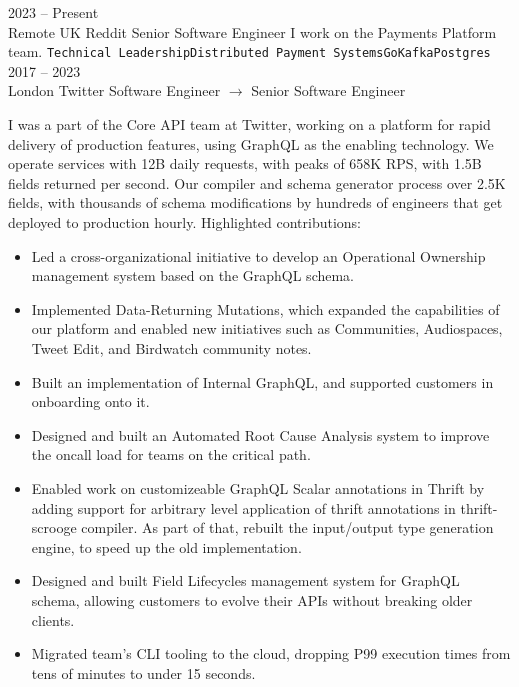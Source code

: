 \documentclass[9pt]{developercv} %
\begin{document}
\begin{entrylist}
	\entry
		{2023 -- Present\\\footnotesize{Remote UK}}
		{Reddit}
		{Senior Software Engineer}
		{
			I work on the Payments Platform team.\newline\newline
			\texttt{Technical Leadership}\slashsep\texttt{Distributed Payment Systems}\slashsep\texttt{Go}\slashsep\texttt{Kafka}\slashsep\texttt{Postgres}
		}
	\entry
		{2017 -- 2023\\\footnotesize{London}}
		{Twitter}
		{Software Engineer $\rightarrow$ Senior Software Engineer}
		{
			I was a part of the Core API team at Twitter, working on a platform for rapid delivery of production features, using GraphQL as the enabling technology. We operate services with 12B daily requests, with peaks of 658K RPS, with 1.5B fields returned per second. Our compiler and schema generator process over 2.5K fields, with thousands of schema modifications by hundreds of engineers that get deployed to production hourly.\newline\newline
			Highlighted contributions:\newline\newline
			\begin{itemize}
				\item Led a cross-organizational initiative to develop an Operational Ownership management system based on the GraphQL schema.
				\item Implemented Data-Returning Mutations, which expanded the capabilities of our platform and enabled new initiatives such as Communities, Audiospaces, Tweet Edit, and Birdwatch community notes.
				\item Built an implementation of Internal GraphQL, and supported customers in onboarding onto it.
				\item Designed and built an Automated Root Cause Analysis system to improve the oncall load for teams on the critical path.
				\item Enabled work on customizeable GraphQL Scalar annotations in Thrift by adding support for arbitrary level application of thrift annotations in thrift-scrooge compiler. As part of that, rebuilt the input/output type generation engine, to speed up the old implementation.
				\item Designed and built Field Lifecycles management system for GraphQL schema, allowing customers to evolve their APIs without breaking older clients.
				\item Migrated team's CLI tooling to the cloud, dropping P99 execution times from tens of minutes to under 15 seconds.

\end{itemize}}
\end{entrylist}
\end{document}
